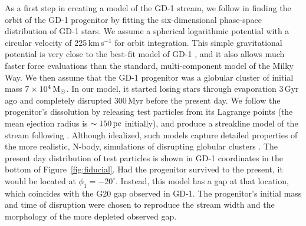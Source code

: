 \documentclass[twocolumn]{aastex62}
\begin{document}
As a first step in creating a model of the GD-1 stream, we follow \citet{pwb} in finding the orbit of the GD-1 progenitor by fitting the six-dimensional phase-space distribution of GD-1 stars.
We assume a spherical logarithmic potential with a circular velocity of 225\,km\,s$^{-1}$ for orbit integration.
This simple gravitational potential is very close to the best-fit model of GD-1 \citep{koposov2010, bowden2015}, and it also allows much faster force evaluations than the standard, multi-component model of the Milky Way.
We then assume that the GD-1 progenitor was a globular cluster of initial mass $7\times10^4\rm\,M_\odot$.
In our model, it started losing stars through evaporation 3\,Gyr ago and completely disrupted 300\,Myr before the present day.
We follow the progenitor's dissolution by releasing test particles from its Lagrange points (the mean ejection radius is $\sim150\,\rm pc$ initially), and produce a streakline model of the stream following \citet{fardal2015}.
Although idealized, such models capture detailed properties of the more realistic, N-body, simulations of disrupting globular clusters \citep{kupper2012}.
The present day distribution of test particles is shown in GD-1 coordinates in the bottom of Figure~\ref{fig:fiducial}.
Had the progenitor survived to the present, it would be located at $\phi_1=-20^\circ$.
Instead, this model has a gap at that location, which coincides with the G20 gap observed in GD-1.
The progenitor's initial mass and time of disruption were chosen to reproduce the stream width and the morphology of the more depleted observed gap.
\end{document}

